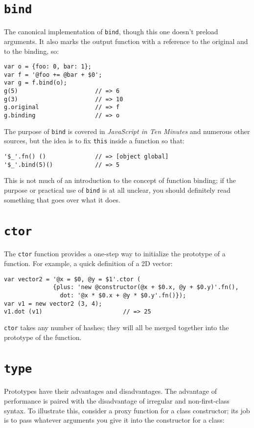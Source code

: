 \documentclass{report}
\begin{document}
\section {{\tt bind}}
      The canonical implementation of \verb|bind|, though this one doesn't preload arguments. It also marks the output function with a reference to the original and to the binding, so:

\begin{verbatim}
var o = {foo: 0, bar: 1};
var f = '@foo += @bar + $0';
var g = f.bind(o);
g(5)                      // => 6
g(3)                      // => 10
g.original                // => f
g.binding                 // => o
\end{verbatim}

      The purpose of \verb|bind| is covered in {\em JavaScript in Ten Minutes} and numerous other sources, but the idea is to fix \verb|this| inside a function so that:

\begin{verbatim}
'$_'.fn() ()              // => [object global]
'$_'.bind(5)()            // => 5
\end{verbatim}

      This is not much of an introduction to the concept of function binding; if the purpose or practical use of \verb|bind| is at all unclear, you should definitely read something that goes
      over what it does.

\section {{\tt ctor}}
      The \verb|ctor| function provides a one-step way to initialize the prototype of a function. For example, a quick definition of a 2D vector:

\begin{verbatim}
var vector2 = '@x = $0, @y = $1'.ctor (
              {plus: 'new @constructor(@x + $0.x, @y + $0.y)'.fn(),
                dot: '@x * $0.x + @y * $0.y'.fn()});
var v1 = new vector2 (3, 4);
v1.dot (v1)                       // => 25
\end{verbatim}

      \verb|ctor| takes any number of hashes; they will all be merged together into the prototype of the function.

\section {{\tt type}}
      Prototypes have their advantages and disadvantages. The advantage of performance is paired with the disadvantage of irregular and non-first-class syntax. To illustrate this, consider a
      proxy function for a class constructor; its job is to pass whatever arguments you give it into the constructor for a class:
\end{document}
